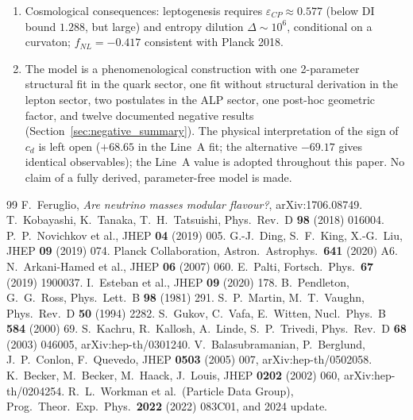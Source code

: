 \documentclass[12pt,a4paper]{article}
\numberwithin{equation}{section}
\begin{document}
\begin{enumerate}[leftmargin=1.5em]
\item Cosmological consequences: leptogenesis requires
\(\varepsilon_{CP}\approx0.577\) (below DI bound \(1.288\), but
large) and entropy dilution \(\Delta\sim10^6\), conditional on a
curvaton; \(f_{NL}=-0.417\) consistent with Planck 2018.

\item The model is a phenomenological construction with one
2-parameter structural fit in the quark sector, one fit without
structural derivation in the lepton sector, two postulates in the
ALP sector, one post-hoc geometric factor, and twelve documented
negative results (Section~\ref{sec:negative_summary}). The physical
interpretation of the sign of \(c_d\) is left open (\(+68.65\) in
the Line~A fit; the alternative \(-69.17\) gives identical
observables); the Line~A value is adopted throughout this paper.
No claim of a fully derived, parameter-free model is made.
\end{enumerate}

\begin{thebibliography}{99}
 F.~Feruglio, \emph{Are neutrino masses modular flavour?}, arXiv:1706.08749.
 T.~Kobayashi, K.~Tanaka, T.~H.~Tatsuishi, Phys.\ Rev.\ D \textbf{98} (2018) 016004.
 P.~P.~Novichkov et al., JHEP \textbf{04} (2019) 005.
 G.-J.~Ding, S.~F.~King, X.-G.~Liu, JHEP \textbf{09} (2019) 074.
 Planck Collaboration, Astron.\ Astrophys.\ \textbf{641} (2020) A6.
 N.~Arkani-Hamed et al., JHEP \textbf{06} (2007) 060.
 E.~Palti, Fortsch.\ Phys.\ \textbf{67} (2019) 1900037.
 I.~Esteban et al., JHEP \textbf{09} (2020) 178.
 B.~Pendleton, G.~G.~Ross, Phys.\ Lett.\ B \textbf{98} (1981) 291.
 S.~P.~Martin, M.~T.~Vaughn, Phys.\ Rev.\ D \textbf{50} (1994) 2282.
 S.~Gukov, C.~Vafa, E.~Witten, Nucl.\ Phys.\ B \textbf{584} (2000) 69.
 S.~Kachru, R.~Kallosh, A.~Linde, S.~P.~Trivedi, Phys.\ Rev.\ D \textbf{68} (2003) 046005, arXiv:hep-th/0301240.
 V.~Balasubramanian, P.~Berglund, J.~P.~Conlon, F.~Quevedo, JHEP \textbf{0503} (2005) 007, arXiv:hep-th/0502058.
 K.~Becker, M.~Becker, M.~Haack, J.~Louis, JHEP \textbf{0202} (2002) 060, arXiv:hep-th/0204254.
 R.~L.~Workman et al.\ (Particle Data Group), Prog.\ Theor.\ Exp.\ Phys.\ \textbf{2022} (2022) 083C01, and 2024 update.
\end{thebibliography}
\end{document}
